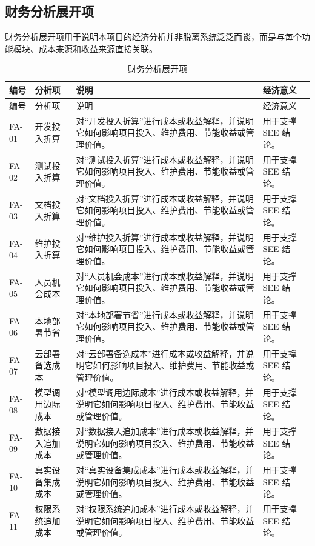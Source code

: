 \documentclass[12pt,a4paper]{ctexart}
\begin{document}
\subsection{财务分析展开项}
财务分析展开项用于说明本项目的经济分析并非脱离系统泛泛而谈，而是与每个功能模块、成本来源和收益来源直接关联。
\begin{longtable}{L{1.7cm}L{4.0cm}L{6.4cm}L{3.4cm}}
\caption{财务分析展开项}\\
\toprule
编号 & 分析项 & 说明 & 经济意义 \\
\midrule
\endfirsthead
\toprule
编号 & 分析项 & 说明 & 经济意义 \\
\midrule
\endhead
FA-01 & 开发投入折算 & 对“开发投入折算”进行成本或收益解释，并说明它如何影响项目投入、维护费用、节能收益或管理价值。 & 用于支撑 SEE 结论。 \\
FA-02 & 测试投入折算 & 对“测试投入折算”进行成本或收益解释，并说明它如何影响项目投入、维护费用、节能收益或管理价值。 & 用于支撑 SEE 结论。 \\
FA-03 & 文档投入折算 & 对“文档投入折算”进行成本或收益解释，并说明它如何影响项目投入、维护费用、节能收益或管理价值。 & 用于支撑 SEE 结论。 \\
FA-04 & 维护投入折算 & 对“维护投入折算”进行成本或收益解释，并说明它如何影响项目投入、维护费用、节能收益或管理价值。 & 用于支撑 SEE 结论。 \\
FA-05 & 人员机会成本 & 对“人员机会成本”进行成本或收益解释，并说明它如何影响项目投入、维护费用、节能收益或管理价值。 & 用于支撑 SEE 结论。 \\
FA-06 & 本地部署节省 & 对“本地部署节省”进行成本或收益解释，并说明它如何影响项目投入、维护费用、节能收益或管理价值。 & 用于支撑 SEE 结论。 \\
FA-07 & 云部署备选成本 & 对“云部署备选成本”进行成本或收益解释，并说明它如何影响项目投入、维护费用、节能收益或管理价值。 & 用于支撑 SEE 结论。 \\
FA-08 & 模型调用边际成本 & 对“模型调用边际成本”进行成本或收益解释，并说明它如何影响项目投入、维护费用、节能收益或管理价值。 & 用于支撑 SEE 结论。 \\
FA-09 & 数据接入追加成本 & 对“数据接入追加成本”进行成本或收益解释，并说明它如何影响项目投入、维护费用、节能收益或管理价值。 & 用于支撑 SEE 结论。 \\
FA-10 & 真实设备集成成本 & 对“真实设备集成成本”进行成本或收益解释，并说明它如何影响项目投入、维护费用、节能收益或管理价值。 & 用于支撑 SEE 结论。 \\
FA-11 & 权限系统追加成本 & 对“权限系统追加成本”进行成本或收益解释，并说明它如何影响项目投入、维护费用、节能收益或管理价值。 & 用于支撑 SEE 结论。 \\

\end{longtable}
\end{document}
